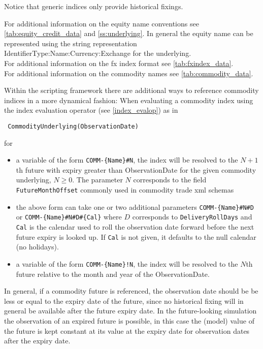 Notice that generic indices only provide historical fixings.

\ifdefined\STModuleDoc
\else
For additional information on the equity name conventions see \ref{tab:equity_credit_data} and \ref{ss:underlying}. In
general the equity name can be represented using the string representation {IdentifierType}:{Name}:{Currency}:{Exchange}
for the underlying. \\
For additional information on the fx index format see \ref{tab:fxindex_data}. \\
For additional information on the commodity names see \ref{tab:commodity_data}.
\fi

Within the scripting framework there are additional ways to reference commodity indices in a more dynamical fashion:
When evaluating a commodity index using the index evaluation operator (see \ref{index_evalop}) as in

\begin{verbatim}
 CommodityUnderlying(ObservationDate)
\end{verbatim}

for

\begin{itemize}
\item a variable of the form \verb+COMM-{Name}#N+, the index will be resolved to the $N+1$th future with expiry greater than
  ObservationDate for the given commodity underlying, $N\geq0$. The parameter $N$ corresponds to the field
  \verb+FutureMonthOffset+ commonly used in commodity trade xml schemas
\item the above form can take one or two additional parameters \verb+COMM-{Name}#N#D+ or \verb+COMM-{Name}#N#D#{Cal}+ where
  $D$ corresponds to \verb+DeliveryRollDays+ and \verb+Cal+ is the calendar used to roll the observation date forward
  before the next future expiry is looked up. If \verb+Cal+ is not given, it defaults to the null calendar (no
  holidays).
\item a variable of the form \verb+COMM-{Name}!N+, the index will be resolved to the $N$th future relative to the month and
  year of the ObservationDate.
\end{itemize}

In general, if a commodity future is referenced, the observation date should be be less or equal to the expiry date of
the future, since no historical fixing will in general be available after the future expiry date. In the future-looking
simulation the observation of an expired future is possible, in this case the (model) value of the future is kept
constant at its value at the expiry date for observation dates after the expiry date.

